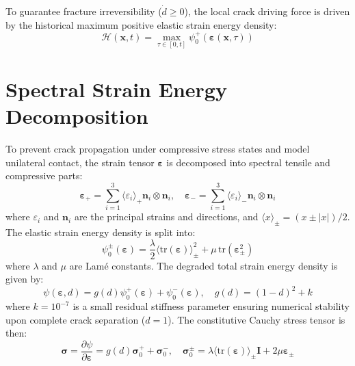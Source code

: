 \documentclass[11pt,a4paper]{report}
\begin{document}
To guarantee fracture irreversibility ($\dot{d} \ge 0$), the local crack driving force is driven by the historical maximum positive elastic strain energy density:
\begin{equation}
\label{eq:history_var}
\mathcal{H}(\mathbf{x}, t) = \max_{\tau \in [0, t]} \psi_0^+(\boldsymbol{\varepsilon}(\mathbf{x}, \tau))
\end{equation}

\section{Spectral Strain Energy Decomposition}
To prevent crack propagation under compressive stress states and model unilateral contact, the strain tensor $\boldsymbol{\varepsilon}$ is decomposed into spectral tensile and compressive parts:
\begin{equation}
\boldsymbol{\varepsilon}_+ = \sum_{i=1}^3 \langle \varepsilon_i \rangle_+ \mathbf{n}_i \otimes \mathbf{n}_i, \quad \boldsymbol{\varepsilon}_- = \sum_{i=1}^3 \langle \varepsilon_i \rangle_- \mathbf{n}_i \otimes \mathbf{n}_i
\end{equation}
where $\varepsilon_i$ and $\mathbf{n}_i$ are the principal strains and directions, and $\langle x \rangle_\pm = (x \pm |x|)/2$. The elastic strain energy density is split into:
\begin{equation}
\label{eq:strain_split}
\psi_0^\pm(\boldsymbol{\varepsilon}) = \frac{\lambda}{2} \langle \mathrm{tr}(\boldsymbol{\varepsilon}) \rangle_\pm^2 + \mu \, \mathrm{tr}(\boldsymbol{\varepsilon}_\pm^2)
\end{equation}
where $\lambda$ and $\mu$ are Lam\'e constants. The degraded total strain energy density is given by:
\begin{equation}
\psi(\boldsymbol{\varepsilon}, d) = g(d) \psi_0^+(\boldsymbol{\varepsilon}) + \psi_0^-(\boldsymbol{\varepsilon}), \quad g(d) = (1 - d)^2 + k
\end{equation}
where $k = 10^{-7}$ is a small residual stiffness parameter ensuring numerical stability upon complete crack separation ($d = 1$). The constitutive Cauchy stress tensor is then:
\begin{equation}
\label{eq:stress_constitutive}
\boldsymbol{\sigma} = \frac{\partial \psi}{\partial \boldsymbol{\varepsilon}} = g(d) \boldsymbol{\sigma}_0^+ + \boldsymbol{\sigma}_0^-, \quad \boldsymbol{\sigma}_0^\pm = \lambda \langle \mathrm{tr}(\boldsymbol{\varepsilon}) \rangle_\pm \mathbf{I} + 2\mu \boldsymbol{\varepsilon}_\pm
\end{equation}
\end{document}
